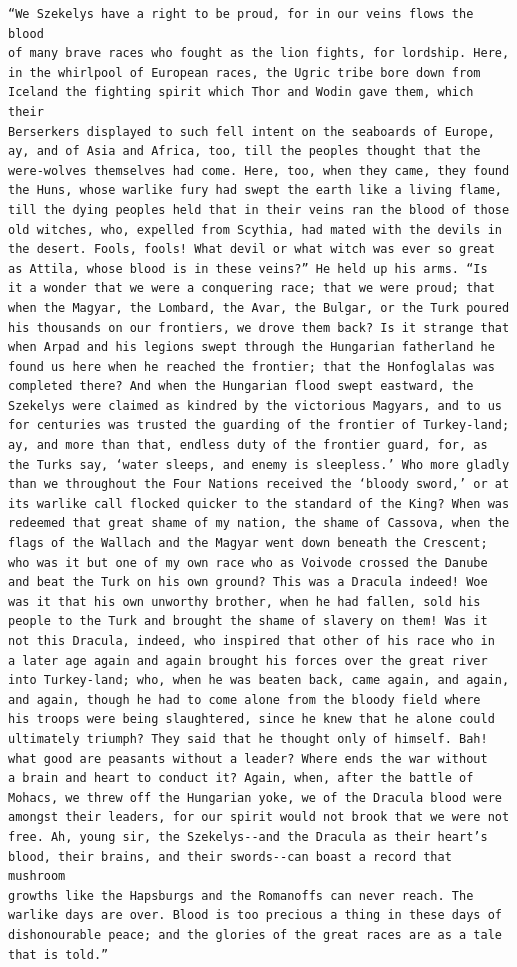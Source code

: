 \documentclass{article}
\begin{document}
\begin{verbatim}
“We Szekelys have a right to be proud, for in our veins flows the blood
of many brave races who fought as the lion fights, for lordship. Here,
in the whirlpool of European races, the Ugric tribe bore down from
Iceland the fighting spirit which Thor and Wodin gave them, which their
Berserkers displayed to such fell intent on the seaboards of Europe,
ay, and of Asia and Africa, too, till the peoples thought that the
were-wolves themselves had come. Here, too, when they came, they found
the Huns, whose warlike fury had swept the earth like a living flame,
till the dying peoples held that in their veins ran the blood of those
old witches, who, expelled from Scythia, had mated with the devils in
the desert. Fools, fools! What devil or what witch was ever so great
as Attila, whose blood is in these veins?” He held up his arms. “Is
it a wonder that we were a conquering race; that we were proud; that
when the Magyar, the Lombard, the Avar, the Bulgar, or the Turk poured
his thousands on our frontiers, we drove them back? Is it strange that
when Arpad and his legions swept through the Hungarian fatherland he
found us here when he reached the frontier; that the Honfoglalas was
completed there? And when the Hungarian flood swept eastward, the
Szekelys were claimed as kindred by the victorious Magyars, and to us
for centuries was trusted the guarding of the frontier of Turkey-land;
ay, and more than that, endless duty of the frontier guard, for, as
the Turks say, ‘water sleeps, and enemy is sleepless.’ Who more gladly
than we throughout the Four Nations received the ‘bloody sword,’ or at
its warlike call flocked quicker to the standard of the King? When was
redeemed that great shame of my nation, the shame of Cassova, when the
flags of the Wallach and the Magyar went down beneath the Crescent;
who was it but one of my own race who as Voivode crossed the Danube
and beat the Turk on his own ground? This was a Dracula indeed! Woe
was it that his own unworthy brother, when he had fallen, sold his
people to the Turk and brought the shame of slavery on them! Was it
not this Dracula, indeed, who inspired that other of his race who in
a later age again and again brought his forces over the great river
into Turkey-land; who, when he was beaten back, came again, and again,
and again, though he had to come alone from the bloody field where
his troops were being slaughtered, since he knew that he alone could
ultimately triumph? They said that he thought only of himself. Bah!
what good are peasants without a leader? Where ends the war without
a brain and heart to conduct it? Again, when, after the battle of
Mohacs, we threw off the Hungarian yoke, we of the Dracula blood were
amongst their leaders, for our spirit would not brook that we were not
free. Ah, young sir, the Szekelys--and the Dracula as their heart’s
blood, their brains, and their swords--can boast a record that mushroom
growths like the Hapsburgs and the Romanoffs can never reach. The
warlike days are over. Blood is too precious a thing in these days of
dishonourable peace; and the glories of the great races are as a tale
that is told.”


\end{verbatim}
\end{document}
